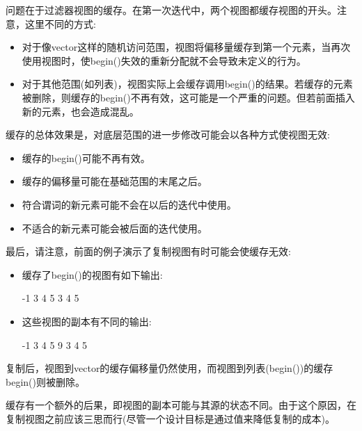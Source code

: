 问题在于过滤器视图的缓存。在第一次迭代中，两个视图都缓存视图的开头。注意，这里不同的方式:

\begin{itemize}
\item
对于像vector这样的随机访问范围，视图将偏移量缓存到第一个元素，当再次使用视图时，使begin()失效的重新分配就不会导致未定义的行为。

\item
对于其他范围(如列表)，视图实际上会缓存调用begin()的结果。若缓存的元素被删除，则缓存的begin()不再有效，这可能是一个严重的问题。但若前面插入新的元素，也会造成混乱。
\end{itemize}

缓存的总体效果是，对底层范围的进一步修改可能会以各种方式使视图无效:

\begin{itemize}
\item
缓存的begin()可能不再有效。

\item
缓存的偏移量可能在基础范围的末尾之后。

\item
符合谓词的新元素可能不会在以后的迭代中使用。

\item
不适合的新元素可能会被后面的迭代使用。
\end{itemize}


最后，请注意，前面的例子演示了复制视图有时可能会使缓存无效:

\begin{itemize}
\item
缓存了begin()的视图有如下输出:

\begin{shell}
-1 3 4 5
3 4 5
\end{shell}

\item
这些视图的副本有不同的输出:

\begin{shell}
-1 3 4 5
9 3 4 5
\end{shell}

\end{itemize}

复制后，视图到vector的缓存偏移量仍然使用，而视图到列表(begin())的缓存begin()则被删除。

缓存有一个额外的后果，即视图的副本可能与其源的状态不同。由于这个原因，在复制视图之前应该三思而行(尽管一个设计目标是通过值来降低复制的成本)。

